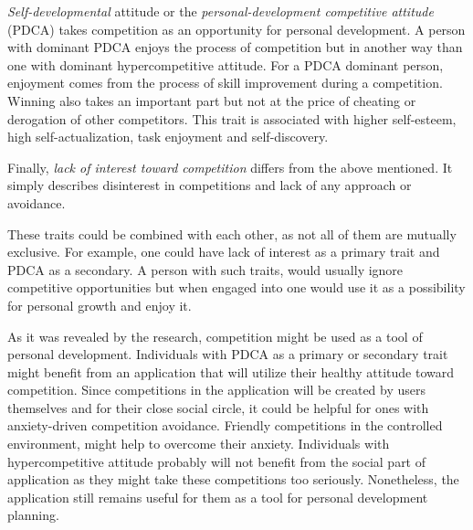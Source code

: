 \textit{Self-developmental} attitude or the \textit{personal-development competitive attitude} (PDCA)
takes competition as an opportunity for personal development.
A person with dominant PDCA enjoys the process of competition but in another way than one with dominant hypercompetitive
attitude.
For a PDCA dominant person, enjoyment comes from the process of skill improvement during a competition.
Winning also takes an important part but not at the price of cheating or derogation of other competitors.
This trait is associated with higher self-esteem, high self-actualization, task enjoyment and self-discovery.\cite{cit-ryckman-pdca}

Finally, \textit{lack of interest toward competition} differs from the above mentioned.
It simply describes disinterest in competitions and lack of any approach or avoidance.

These traits could be combined with each other, as not all of them are mutually exclusive.
For example, one could have lack of interest as a primary trait and PDCA as a secondary.
A person with such traits, would usually ignore competitive opportunities but when engaged into one
would use it as a possibility for personal growth and enjoy it.\cite{the-four-faces-of-competetition}

As it was revealed by the research, competition might be used as a tool of personal development.
Individuals with PDCA as a primary or secondary trait might benefit from an application that will utilize their healthy
attitude toward competition.
Since competitions in the application will be created by users themselves and for their close social circle,
it could be helpful for ones with anxiety-driven competition avoidance.
Friendly competitions in the controlled environment, might help to overcome their anxiety.
Individuals with hypercompetitive attitude probably will not benefit from the social part of application
as they might take these competitions too seriously.
Nonetheless, the application still remains useful for them as a tool for personal development planning.